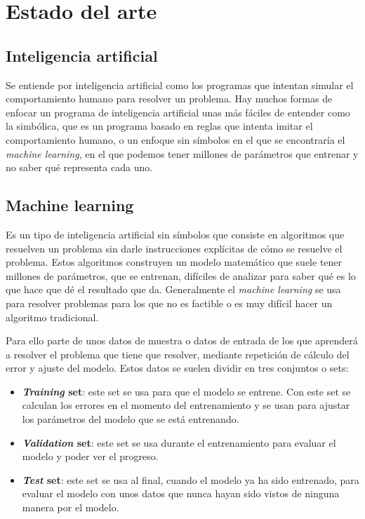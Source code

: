 \documentclass[12pt,a4paper]{article}
\begin{document}
\newpage
\section{Estado del arte}

\subsection{Inteligencia artificial}
Se entiende por inteligencia artificial como los programas que intentan simular el comportamiento humano para resolver un problema. Hay muchos formas de enfocar un programa de inteligencia artificial unas más fáciles de entender como la simbólica, que es un programa basado en reglas que intenta imitar el comportamiento humano, o un enfoque sin símbolos en el que se encontraría el \textit{machine learning}, en el que podemos tener millones de parámetros que entrenar y no saber qué representa cada uno.

\subsection{Machine learning}
Es un tipo de inteligencia artificial sin símbolos que consiste en algoritmos que resuelven un problema sin darle instrucciones explícitas de cómo se resuelve el problema. Estos algoritmos construyen un modelo matemático que suele tener millones de parámetros, que se entrenan, difíciles de analizar para saber qué es lo que hace que dé el resultado que da. Generalmente el \textit{machine learning} se usa para resolver problemas para los que no es factible o es muy difícil hacer un algoritmo tradicional.
\bigskip

Para ello parte de unos datos de muestra o datos de entrada de los que aprenderá a resolver el problema que tiene que resolver, mediante repetición de cálculo del error y ajuste del modelo. Estos datos se suelen dividir en tres conjuntos o sets:

\begin{itemize}
\item \textbf{\textit{Training} set}: este set se usa para que el modelo se entrene. Con este set se calculan los errores en el momento del entrenamiento y se usan para ajustar los parámetros del modelo que se está entrenando.
\item \textbf{\textit{Validation} set}: este set se usa durante el entrenamiento para evaluar el modelo y poder ver el progreso.
\item \textbf{\textit{Test} set}: este set se usa al final, cuando el modelo ya ha sido entrenado, para evaluar el modelo con unos datos que nunca hayan sido vistos de ninguna manera por el modelo.
\end{itemize}
\end{document}
